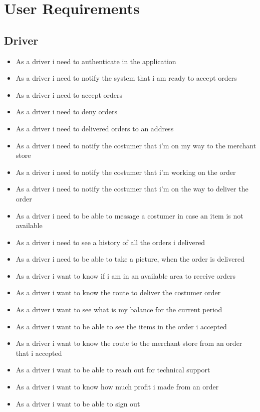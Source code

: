 \section{User Requirements}
\subsection{Driver}
\begin{itemize}
    \item As a driver i need to authenticate in the application
    \item As a driver i need to notify the system that i am ready to 
    accept orders
    \item As a driver i need to accept orders
    \item As a driver i need to deny orders
    \item As a driver i need to delivered orders to an address
    \item As a driver i need to notify the costumer that i’m on my way to the 
    merchant store
    \item As a driver i need to notify the costumer that i’m working on the 
    order
    \item As a driver i need to notify the costumer that i’m on the way to 
    deliver the order
    \item As a driver i need to be able to message a costumer in case an 
    item is not available
    \item As a driver i need to see a history of all the orders i delivered
    \item As a driver i need to be able to take a picture, when the order is 
    delivered
    \item As a driver i want to know if i am in an available area to receive 
    orders
    \item As a driver i want to know the route to deliver the costumer order
    \item As a driver i want to see what is my balance for the current period
    \item As a driver i want to be able to see the items in the order i 
    accepted
    \item As a driver i want to know the route to the merchant store from an 
    order that i accepted
    \item As a driver i want to be able to reach out for technical support
    \item As a driver i want to know how much profit i made from an order
    \item As a driver i want to be able to sign out
\end{itemize}
